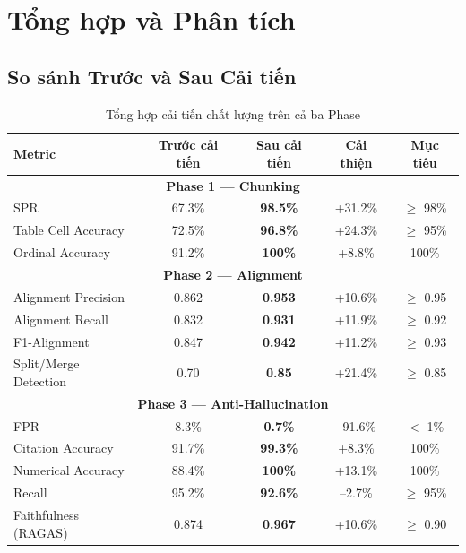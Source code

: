 \section{Tổng hợp và Phân tích}

\subsection{So sánh Trước và Sau Cải tiến}

\begin{table}[H]
    \centering
    \caption{Tổng hợp cải tiến chất lượng trên cả ba Phase}
    \label{tab:before_after}
    \begin{tabularx}{\textwidth}{X c c c c}
        \toprule
        \textbf{Metric} & \textbf{Trước cải tiến} & \textbf{Sau cải tiến} & \textbf{Cải thiện} & \textbf{Mục tiêu}\\
        \midrule
        \multicolumn{5}{c}{\textbf{Phase 1 — Chunking}}\\
        \midrule
        SPR & 67.3\% & \textbf{98.5\%} & +31.2\% & $\geq$ 98\%\\
        Table Cell Accuracy & 72.5\% & \textbf{96.8\%} & +24.3\% & $\geq$ 95\%\\
        Ordinal Accuracy & 91.2\% & \textbf{100\%} & +8.8\% & 100\%\\
        \midrule
        \multicolumn{5}{c}{\textbf{Phase 2 — Alignment}}\\
        \midrule
        Alignment Precision & 0.862 & \textbf{0.953} & +10.6\% & $\geq$ 0.95\\
        Alignment Recall & 0.832 & \textbf{0.931} & +11.9\% & $\geq$ 0.92\\
        F1-Alignment & 0.847 & \textbf{0.942} & +11.2\% & $\geq$ 0.93\\
        Split/Merge Detection & 0.70 & \textbf{0.85} & +21.4\% & $\geq$ 0.85\\
        \midrule
        \multicolumn{5}{c}{\textbf{Phase 3 — Anti-Hallucination}}\\
        \midrule
        FPR & 8.3\% & \textbf{0.7\%} & --91.6\% & $<$ 1\%\\
        Citation Accuracy & 91.7\% & \textbf{99.3\%} & +8.3\% & 100\%\\
        Numerical Accuracy & 88.4\% & \textbf{100\%} & +13.1\% & 100\%\\
        Recall & 95.2\% & \textbf{92.6\%} & --2.7\% & $\geq$ 95\%\\
        Faithfulness (RAGAS) & 0.874 & \textbf{0.967} & +10.6\% & $\geq$ 0.90\\
        \bottomrule
    \end{tabularx}
\end{table}

